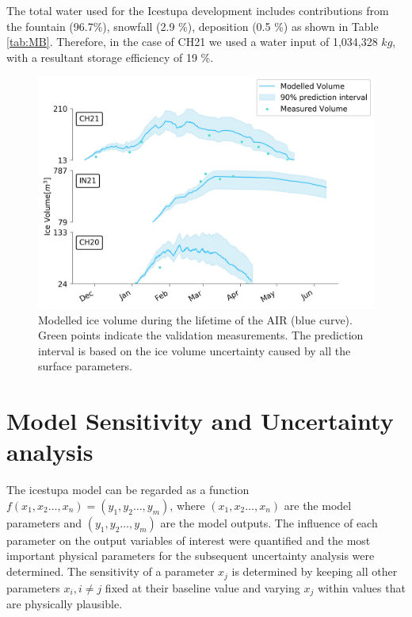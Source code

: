 \documentclass[utf8]{frontiersSCNS} %
\begin{document}
The total water used for the Icestupa development includes contributions from the fountain (96.7\%), snowfall (2.9 \%),
deposition (0.5 \%) as shown in Table \ref{tab:MB}. Therefore, in the case of CH21 we used a water input of 1,034,328
$kg$, with a resultant storage efficiency of 19 \%.

\begin{figure} 
    \begin{center} 
    \includegraphics[width=\linewidth]{Figures/icev_results.jpg} 
\end{center}
  \caption{Modelled ice volume during the lifetime of the AIR (blue curve). Green points indicate the validation
  measurements. The prediction interval is based on the ice volume uncertainty caused by all the surface parameters.  } 
\label{fig:results} 
\end{figure}


\section{Model Sensitivity and Uncertainty analysis}

The icestupa model can be regarded as a function $f(x_1,x_2 \dots, x_n) = (y_1,y_2 \dots, y_m)$, where $(x_1,x_2
\dots, x_n)$ are the model parameters and $(y_1,y_2 \dots, y_m)$ are the model outputs. The influence of each
parameter on the output variables of interest were quantified and the most important physical parameters for the
subsequent uncertainty analysis were determined. The sensitivity of a parameter $x_j$ is determined by keeping all
other parameters $x_i, i \neq j$ fixed at their baseline value and varying $x_j$ within values that are physically
plausible.
\end{document}
